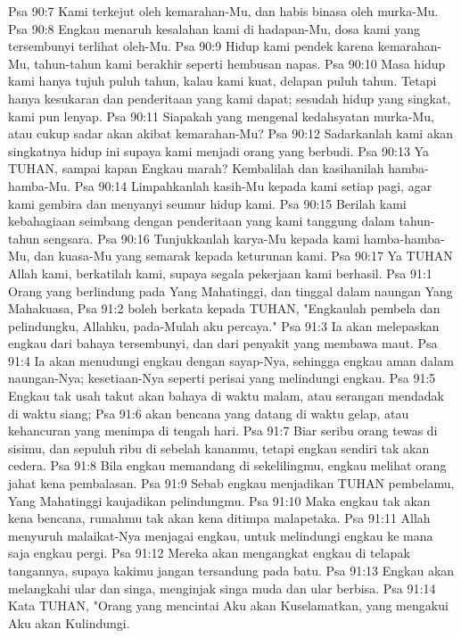 Psa 90:7  Kami terkejut oleh kemarahan-Mu, dan habis binasa oleh murka-Mu.
Psa 90:8  Engkau menaruh kesalahan kami di hadapan-Mu, dosa kami yang tersembunyi terlihat oleh-Mu.
Psa 90:9  Hidup kami pendek karena kemarahan-Mu, tahun-tahun kami berakhir seperti hembusan napas.
Psa 90:10  Masa hidup kami hanya tujuh puluh tahun, kalau kami kuat, delapan puluh tahun. Tetapi hanya kesukaran dan penderitaan yang kami dapat; sesudah hidup yang singkat, kami pun lenyap.
Psa 90:11  Siapakah yang mengenal kedahsyatan murka-Mu, atau cukup sadar akan akibat kemarahan-Mu?
Psa 90:12  Sadarkanlah kami akan singkatnya hidup ini supaya kami menjadi orang yang berbudi.
Psa 90:13  Ya TUHAN, sampai kapan Engkau marah? Kembalilah dan kasihanilah hamba-hamba-Mu.
Psa 90:14  Limpahkanlah kasih-Mu kepada kami setiap pagi, agar kami gembira dan menyanyi seumur hidup kami.
Psa 90:15  Berilah kami kebahagiaan seimbang dengan penderitaan yang kami tanggung dalam tahun-tahun sengsara.
Psa 90:16  Tunjukkanlah karya-Mu kepada kami hamba-hamba-Mu, dan kuasa-Mu yang semarak kepada keturunan kami.
Psa 90:17  Ya TUHAN Allah kami, berkatilah kami, supaya segala pekerjaan kami berhasil.
Psa 91:1  Orang yang berlindung pada Yang Mahatinggi, dan tinggal dalam naungan Yang Mahakuasa,
Psa 91:2  boleh berkata kepada TUHAN, "Engkaulah pembela dan pelindungku, Allahku, pada-Mulah aku percaya."
Psa 91:3  Ia akan melepaskan engkau dari bahaya tersembunyi, dan dari penyakit yang membawa maut.
Psa 91:4  Ia akan menudungi engkau dengan sayap-Nya, sehingga engkau aman dalam naungan-Nya; kesetiaan-Nya seperti perisai yang melindungi engkau.
Psa 91:5  Engkau tak usah takut akan bahaya di waktu malam, atau serangan mendadak di waktu siang;
Psa 91:6  akan bencana yang datang di waktu gelap, atau kehancuran yang menimpa di tengah hari.
Psa 91:7  Biar seribu orang tewas di sisimu, dan sepuluh ribu di sebelah kananmu, tetapi engkau sendiri tak akan cedera.
Psa 91:8  Bila engkau memandang di sekelilingmu, engkau melihat orang jahat kena pembalasan.
Psa 91:9  Sebab engkau menjadikan TUHAN pembelamu, Yang Mahatinggi kaujadikan pelindungmu.
Psa 91:10  Maka engkau tak akan kena bencana, rumahmu tak akan kena ditimpa malapetaka.
Psa 91:11  Allah menyuruh malaikat-Nya menjagai engkau, untuk melindungi engkau ke mana saja engkau pergi.
Psa 91:12  Mereka akan mengangkat engkau di telapak tangannya, supaya kakimu jangan tersandung pada batu.
Psa 91:13  Engkau akan melangkahi ular dan singa, menginjak singa muda dan ular berbisa.
Psa 91:14  Kata TUHAN, "Orang yang mencintai Aku akan Kuselamatkan, yang mengakui Aku akan Kulindungi.

